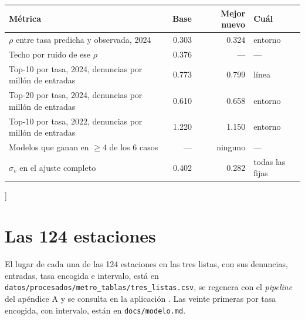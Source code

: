 \documentclass[conference]{IEEEtran}
\newcommand{\pme}{por millón de entradas}
\begin{document}
{\begin{center}
\vspace{1.6em}
\begin{minipage}{0.86\textwidth}
\centering
{}
\label{tab:covariables}
\small\setlength\tabcolsep{5pt}
\begin{tabular}{@{}lrrl@{}}
\toprule
Métrica & Base & Mejor nuevo & Cuál \\
\midrule
$\rho$ entre tasa predicha y observada, 2024 & 0.303 & 0.324 & entorno \\
Techo por ruido de ese $\rho$ & 0.376 & --- & --- \\
Top-10 por tasa, 2024, denuncias \pme & 0.773 & 0.799 & línea \\
Top-20 por tasa, 2024, denuncias \pme & 0.610 & 0.658 & entorno \\
Top-10 por tasa, 2022, denuncias \pme & 1.220 & 1.150 & entorno \\
Modelos que ganan en $\geq 4$ de los 6 casos & --- & ninguno & --- \\
$\sigma_v$ en el ajuste completo & 0.402 & 0.282 & todas las fijas \\
\bottomrule
\end{tabular}
\end{minipage}
\end{center}
\vspace{1em}
}]

\section{Las 124 estaciones}

El lugar de cada una de las 124 estaciones en las tres listas, con sus denuncias, entradas, tasa encogida e intervalo, está en \texttt{datos/procesados/metro\_tablas/tres\_listas.csv}, se regenera con el \emph{pipeline} del apéndice A y se consulta en la aplicación \cite{app_metro}. Las veinte primeras por tasa encogida, con intervalo, están en \texttt{docs/modelo.md}.
\end{document}
